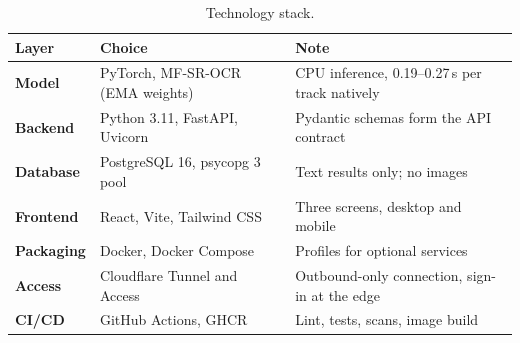 \begin{table}[tbp]
\centering
\caption{Technology stack.}
\label{tab:stack}
\begin{tabularx}{\textwidth}{@{}>{\bfseries}P{20mm} P{34mm} L@{}}
\toprule
Layer & Choice & Note \\
\midrule
Model & PyTorch, MF-SR-OCR (EMA weights) & CPU inference, 0.19--0.27\,s per track natively \\
Backend & Python 3.11, FastAPI, Uvicorn & Pydantic schemas form the API contract \\
Database & PostgreSQL 16, psycopg 3 pool & Text results only; no images \\
Frontend & React, Vite, Tailwind CSS & Three screens, desktop and mobile \\
Packaging & Docker, Docker Compose & Profiles for optional services \\
Access & Cloudflare Tunnel and Access & Outbound-only connection, sign-in at the edge \\
CI/CD & GitHub Actions, GHCR & Lint, tests, scans, image build \\
\bottomrule
\end{tabularx}
\end{table}
